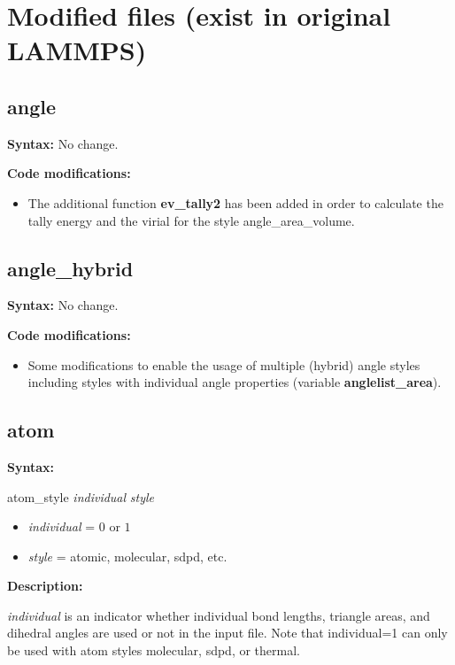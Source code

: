 \chapter{Modified files (exist in original LAMMPS)}

\section{angle}

{\bfseries Syntax:} No change.
\vspace{0.2cm}

{\bfseries Code modifications:}
\begin{itemize}
\item The additional function \textbf{ev\_tally2} has been added in order to calculate the tally energy and the virial for the style angle\_area\_volume.
\end{itemize}
  
\section{angle\_hybrid}

{\bfseries Syntax:} No change.
\vspace{0.2cm}

{\bfseries Code modifications:}
\begin{itemize}
\item Some modifications to enable the usage of multiple (hybrid) angle styles including styles with individual angle properties (variable \textbf{anglelist\_area}). 
\end{itemize}
  
\section{atom}
\label{sec:atom}

{\bfseries Syntax:}

atom\_style \textit{individual} \textit{style}
\begin{itemize}
\item \textit{individual} = $0$ or $1$
\item \textit{style} = atomic, molecular, sdpd, etc.
\end{itemize}

{\bfseries Description:}

\textit{individual} is an indicator whether individual bond lengths, triangle areas, and dihedral angles are used or not in the input file. Note that
individual=1 can only be used with atom styles molecular, sdpd, or thermal.

